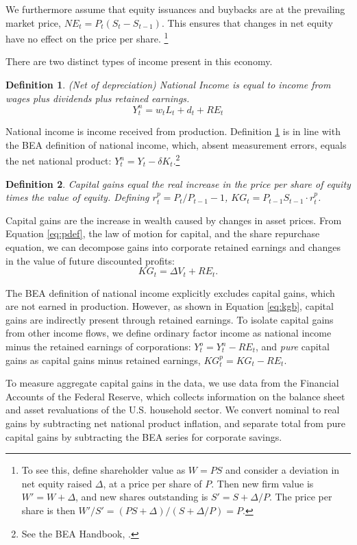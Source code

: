\documentclass[12pt]{article}
\newcommand{\be}{\begin{equation}}
\newcommand{\ee}{\end{equation}}
\newtheorem{definition}{Definition}
\begin{document}
We furthermore assume that equity issuances and buybacks are at the prevailing market price, $NE_t = P_t (S_t - S_{t-1})$. This ensures that changes in net equity have no effect on the price per share. \footnote{To see this, define shareholder value as $W = P S$ and consider a deviation in net equity raised $\Delta$, at a price per share of $P$. Then new firm value is $W' = W + \Delta$, and new shares outstanding is $S' = S + \Delta/P$. The price per share is then $W'/S' = (P S + \Delta) / (S + \Delta / P) = P$.}

There are two distinct types of income present in this economy. 

\begin{definition} \label{def:nat_inc} (Net of depreciation) National Income is equal to income from wages plus dividends plus retained earnings.
\be
\label{eq:nat}
Y^n_t =  w_t L_t + d_t + RE_t 
\ee
\end{definition}

National income is income received from production. Definition \ref{def:nat_inc} is in line with the BEA definition of national income, which, absent measurement errors, equals the net national product: $Y^n_t   = Y_t - \delta K_t$.\footnote{See the BEA Handbook, \citet{fox2009concepts}.}

\begin{definition} \label{def:kg} Capital gains equal the real increase in the price per share of equity times the value of equity. Defining $r^p_t = P_t / P_{t-1} - 1$, $KG_t = P_{t-1} S_{t-1} \cdot r^p_t$. \end{definition}
\noindent Capital gains are the increase in wealth caused by changes in asset prices. From Equation \ref{eq:pdef}, the law of motion for capital, and the share repurchase equation, we can decompose gains into corporate retained earnings and changes in the value of future discounted profits: 
\be
\label{eq:kgb}
KG_t = \Delta V_t + RE_t.
\ee

The BEA definition of national income explicitly excludes capital gains, which are not earned in production. However, as shown in Equation \ref{eq:kgb}, capital gains are indirectly present through retained earnings. To isolate capital gains from other income flows, we define ordinary factor income as national income minus the retained earnings of corporations: $Y^{o}_t = Y^n_t - RE_t$, and \textit{pure} capital gains as capital gains minus retained earnings, $KG^p_t = KG_t - RE_t$. 

To measure aggregate capital gains in the data, we use data from the Financial Accounts of the Federal Reserve, which collects information on the balance sheet and asset revaluations of the U.S. household sector. We convert nominal to real gains by subtracting net national product inflation, and separate total from pure capital gains by subtracting the BEA series for corporate savings. 
\end{document}
